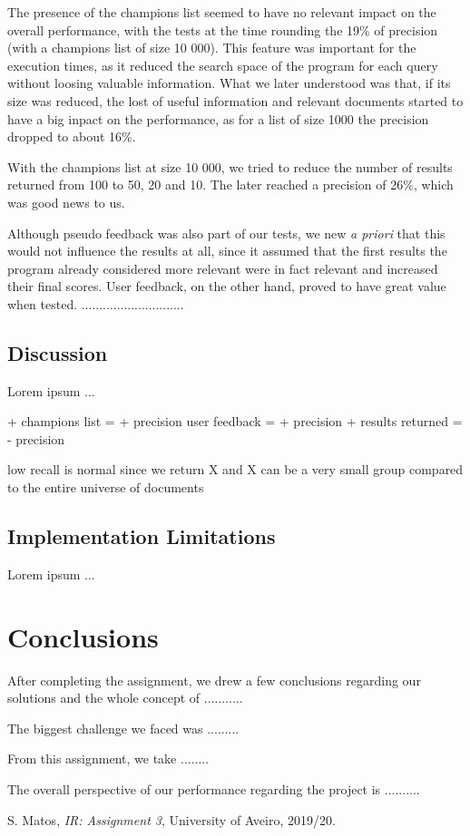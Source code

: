 \documentclass[12pt]{article}
\begin{document}
The presence of the champions list seemed to have no relevant impact on the 
overall performance, with the tests at the time rounding the 19\% of precision
(with a champions list of size 10 000).
This feature was important for the execution times, as it reduced the search 
space of the program for each query without loosing valuable information.
What we later understood was that, if its size was reduced, the lost of useful
information and relevant documents started to have a big inpact on the performance,
as for a list of size 1000 the precision dropped to about 16\%.

With the champions list at size 10 000, we tried to reduce the number of results
returned from 100 to 50, 20 and 10. 
The later reached a precision of 26\%, which was good news to us.

Although pseudo feedback was also part of our tests, we new \textit{a priori} 
that this would not influence the results at all, since it assumed that the first
results the program already considered more relevant were in fact relevant and 
increased their final scores.
User feedback, on the other hand, proved to have great value when tested.
.............................







\subsection{Discussion}

Lorem ipsum ...

+ champions list = + precision
user feedback = + precision
+ results returned = - precision

low recall is normal since we return X and X can be a very small group compared to the entire universe of documents

\subsection{Implementation Limitations}

Lorem ipsum ...

\section{Conclusions}

After completing the assignment, we drew a few conclusions regarding our
solutions and the whole concept of ...........

The biggest challenge we faced was .........

From this assignment, we take ........

The overall perspective of our performance regarding the project is ..........

\begin{thebibliography}{9}
  

    S. Matos,
    \textit{IR: Assignment 3},
    University of Aveiro,
    2019/20.
  
\end{thebibliography}

\clearpage
\end{document}
